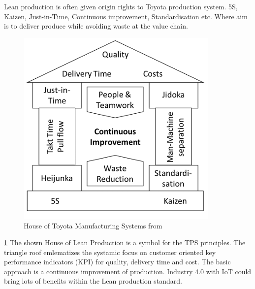 \documentclass[article,a4paper]{IEEEtran}
\begin{document}
    \newline\newline
    Lean production is often given origin rights to Toyota production system. 5S, Kaizen, Just-in-Time, Continuous improvement, Standardisation etc. Where aim is to deliver produce while avoiding waste at the value chain. 
    \begin{figure}
        \includegraphics[width=\columnwidth]{HouseofToyota.png} 
        \caption{House of Toyota Manufacturing Systems from \cite{Impact_Lean_Prod}}
        \label{fig1:House of Toyota Manufacturing System}   
    \end{figure}
    \ref{fig1:House of Toyota Manufacturing System}
    The shown House of Lean Production is a symbol for the TPS principles. The triangle roof emlematizes the systamic focus on customer oriented key performance indicators (KPI) for quality, delivery time and cost. The basic approach is a continuous improvement of production. Industry 4.0 with IoT could bring lots of benefits within the Lean production standard. \cite{Impact_Lean_Prod}
    \newline\newline
    
\end{document}
